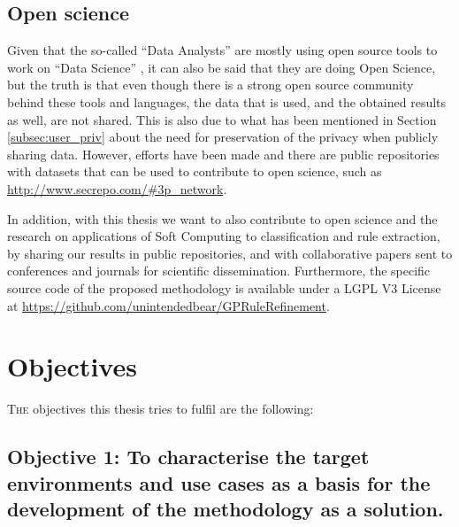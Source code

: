 \subsection{Open science}
\label{subsec:openS}

Given that the so-called ``Data Analysts'' are mostly using open source tools to work on ``Data Science'' \cite{OS_toptools, ML_popularlang}, it can also be said that they are doing Open Science, but the truth is that even though there is a strong open source community behind these tools and languages, the data that is used, and the obtained results as well, are not shared. This is also due to what has been mentioned in Section \ref{subsec:user_priv} about the need for preservation of the privacy when publicly sharing data. However, efforts have been made and there are public repositories with datasets that can be used to contribute to open science, such as \url{http://www.secrepo.com/#3p\_network}.

In addition, with this thesis we want to also contribute to open science and the research on applications of Soft Computing to classification and rule extraction, by sharing our results in public repositories, and with collaborative papers sent to conferences and journals for scientific dissemination. 
 Furthermore, the specific source code of the proposed methodology is available under a LGPL V3 License at \url{https://github.com/unintendedbear/GPRuleRefinement}. 

\section{Objectives}                     
\label{sec:intro:objs}

\lettrine{T}{he} objectives this thesis tries to fulfil are the following:

\newcommand{\objectivescenarios}{To characterise the target environments and use cases as a basis for the development of the methodology as a solution.} 

\subsection*{Objective 1: \objectivescenarios}
\label{subsec:intro:obj:problems}


